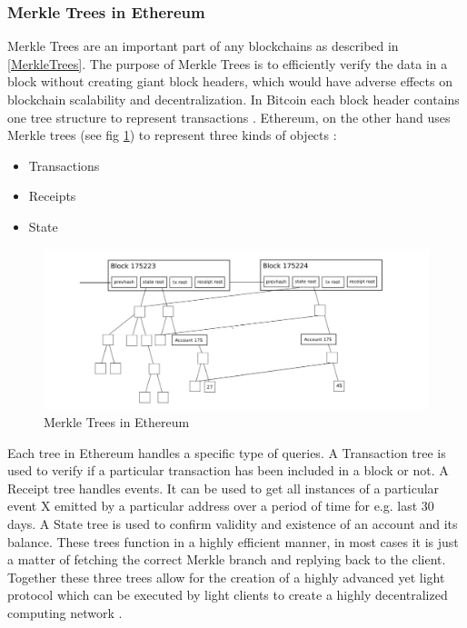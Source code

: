 \subsubsection{Merkle Trees in Ethereum}
Merkle Trees are an important part of any blockchains as described in \ref{MerkleTrees}.  The purpose of Merkle Trees is to efficiently verify the data in a block without creating giant block headers, which would have adverse effects on blockchain scalability and decentralization. In Bitcoin each block header contains one tree structure to represent transactions \cite{misc:025}. Ethereum, on the other hand uses Merkle trees (see fig \ref{fig:EthTree}) to represent three kinds of objects \cite{misc:025}:

\begin{itemize}
\item Transactions 
\item Receipts
\item State
\end{itemize}

\begin{figure}[h]
	\centering
    \includegraphics[width=180mm,scale=1]{figs/ethtree}
	\caption{Merkle Trees in Ethereum \cite{misc:025}}
	\label{fig:EthTree}
\end{figure}

Each tree in Ethereum handles a specific type of queries. A Transaction tree is used to verify if a particular transaction has been included in a block or not.  A Receipt tree handles events. It can be used to get all instances of a particular event X emitted by a particular address over a period of time for e.g. last 30 days. A State tree is used to confirm validity and existence of an account and its balance. These trees function in a highly efficient manner, in most cases it is just a matter of fetching the correct Merkle branch and replying back to the client.  Together these three trees allow for the creation of a highly advanced yet light protocol which can be executed by light clients to create a highly decentralized computing network \cite{misc:025}. 
 
